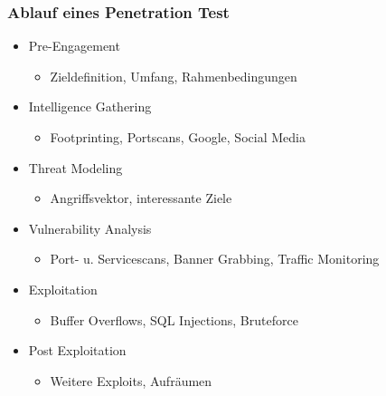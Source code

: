 \documentclass[11pt]{beamer}
\begin{document}
\begin{frame}[fragile]\frametitle{Ablauf eines Penetration Test}
\label{sec-1-3}
\begin{itemize}

\item Pre-Engagement
\label{sec-1-3-1}%
\begin{itemize}

\item Zieldefinition, Umfang, Rahmenbedingungen\\
\label{sec-1-3-1-1}%
\end{itemize} %

\item Intelligence Gathering
\label{sec-1-3-2}%
\begin{itemize}

\item Footprinting, Portscans, Google, Social Media\\
\label{sec-1-3-2-1}%
\end{itemize} %

\item Threat Modeling
\label{sec-1-3-3}%
\begin{itemize}

\item Angriffsvektor, interessante Ziele\\
\label{sec-1-3-3-1}%
\end{itemize} %

\item Vulnerability Analysis
\label{sec-1-3-4}%
\begin{itemize}

\item Port- u. Servicescans, Banner Grabbing, Traffic Monitoring\\
\label{sec-1-3-4-1}%
\end{itemize} %

\item Exploitation
\label{sec-1-3-5}%
\begin{itemize}

\item Buffer Overflows, SQL Injections, Bruteforce\\
\label{sec-1-3-5-1}%
\end{itemize} %

\item Post Exploitation
\label{sec-1-3-6}%
\begin{itemize}

\item Weitere Exploits, Aufräumen\\
\label{sec-1-3-6-1}%
\end{itemize} %
\end{itemize} %
\end{frame}
\end{document}
